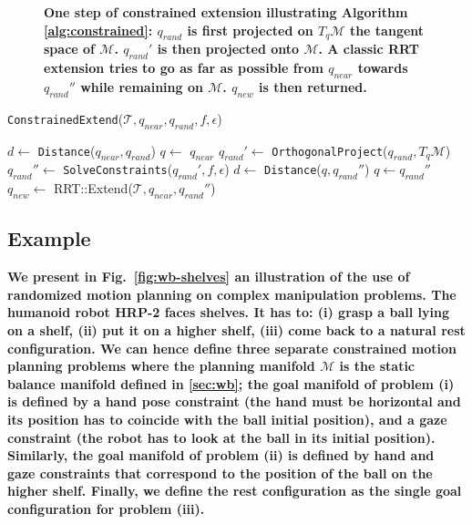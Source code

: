 \documentclass{article}
\newcommand\manifold{\mathcal{M}}
\begin{document}
\begin{figure}[h]
\begin{minipage}[c]{0.3\linewidth}


\end{minipage}

\caption{\textbf{One step of constrained extension illustrating
    Algorithm \ref{alg:constrained}: $q_{rand}$ is first projected on
    $T_q\manifold$ the tangent space of $\manifold$. $q_{rand}'$ is
    then projected onto $\manifold$. A classic RRT extension tries to
    go as far as possible from $q_{near}$ towards $q_{rand}''$ while
    remaining on $\manifold$. $q_{new}$ is then returned.}}
\label{fig:gikrrt}
\end{figure}

\begin{algorithm}[h]
  \caption{\texttt{ConstrainedExtend}($\mathcal{T},q_{near},q_{rand},f,\epsilon$)}
  \label{alg:constrained}
  \begin{algorithmic}
    \STATE $d \leftarrow$ \texttt{Distance}($q_{near}, q_{rand}$)
    \STATE $q \leftarrow$ $q_{near}$
    \STATE $q_{rand}' \leftarrow$ \texttt{OrthogonalProject}($q_{rand}, T_q\manifold$)
    \STATE $q_{rand}'' \leftarrow$ \texttt{SolveConstraints}($q_{rand}',f,\epsilon$)
    \STATE $d \leftarrow$ \texttt{Distance}($q,q_{rand}''$)
    \STATE $q \leftarrow q_{rand}''$
    \ENDWHILE
    \STATE $q_{new} \leftarrow$ RRT::Extend($\mathcal{T},q_{near},q_{rand}''$)
  \end{algorithmic}
\end{algorithm}
    
\subsection{Example}

\textbf{We present in Fig.~\ref{fig:wb-shelves} an illustration of the
  use of randomized motion planning on complex manipulation
  problems. The humanoid robot HRP-2 faces shelves. It has to: (i)
  grasp a ball lying on a shelf, (ii) put it on a higher shelf, (iii)
  come back to a natural rest configuration. We can hence define three
  separate constrained motion planning problems where the planning
  manifold $\manifold$ is the static balance manifold defined in
  \ref{sec:wb}; the goal manifold of problem (i) is defined by a hand
  pose constraint (the hand must be horizontal and its position has to
  coincide with the ball initial position), and a gaze constraint (the
  robot has to look at the ball in its initial position). Similarly,
  the goal manifold of problem (ii) is defined by hand and gaze
  constraints that correspond to the position of the ball on the
  higher shelf. Finally, we define the rest configuration as the
  single goal configuration for problem (iii).}
\end{document}
